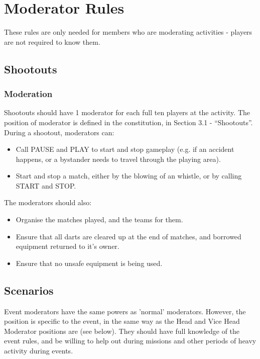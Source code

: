 \documentclass{report}
\begin{document}
\chapter{Moderator Rules}

These rules are only needed for members who are moderating activities - players are not required to know them.

\section{Shootouts}
	
	\subsection{Moderation}

	Shootouts should have 1 moderator for each full ten players at the activity. The position of moderator is defined in the constitution, in Section 3.1 - ``Shootouts''. During a shootout, moderators can:

    \begin{itemize}
		\item Call PAUSE and PLAY to start and stop gameplay (e.g. if an accident happens, or a bystander needs to travel through the playing area).
		\item Start and stop a match, either by the blowing of an whistle, or by calling START and STOP.
	\end{itemize}
	
	\noindent The moderators should also:
		
	\begin{itemize}
		\item Organise the matches played, and the teams for them.
		\item Ensure that all darts are cleared up at the end of matches, and borrowed equipment returned to it's owner.
		\item Ensure that no unsafe equipment is being used.
	\end{itemize}

\section{Scenarios}

	Event moderators have the same powers as 'normal' moderators. However, the position is specific to the event, in the same way as the Head and Vice Head Moderator positions are (see below). They should have full knowledge of the event rules, and be willing to help out during missions and other periods of heavy activity during events.
\end{document}
